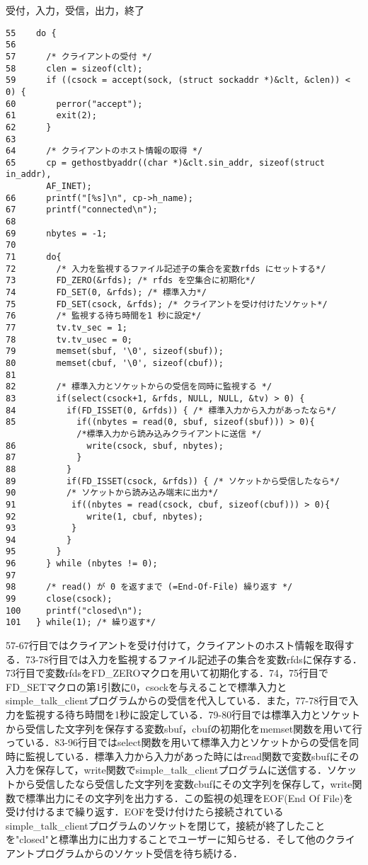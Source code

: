 \documentclass[a4j]{jarticle}
\newenvironment{bit}{\begin{breakitembox}}{\end{breakitembox}} %
\newcommand{\stc}{simple\_talk\_clientプログラム}
\begin{document}
\begin{bit}[l]{受付，入力，受信，出力，終了}
\begin{verbatim}
55	  do {
56
57	    /* クライアントの受付 */
58	    clen = sizeof(clt);
59	    if ((csock = accept(sock, (struct sockaddr *)&clt, &clen)) < 0) {
60	      perror("accept");
61	      exit(2);
62	    }
63
64	    /* クライアントのホスト情報の取得 */
65	    cp = gethostbyaddr((char *)&clt.sin_addr, sizeof(struct in_addr),
        AF_INET);
66	    printf("[%s]\n", cp->h_name);
67	    printf("connected\n");
68
69	    nbytes = -1;
70
71	    do{
72	      /* 入力を監視するファイル記述子の集合を変数rfds にセットする*/
73	      FD_ZERO(&rfds); /* rfds を空集合に初期化*/
74	      FD_SET(0, &rfds); /* 標準入力*/
75	      FD_SET(csock, &rfds); /* クライアントを受け付けたソケット*/
76	      /* 監視する待ち時間を1 秒に設定*/
77	      tv.tv_sec = 1;
78	      tv.tv_usec = 0;
79	      memset(sbuf, '\0', sizeof(sbuf));
80	      memset(cbuf, '\0', sizeof(cbuf));
81
82	      /* 標準入力とソケットからの受信を同時に監視する */
83	      if(select(csock+1, &rfds, NULL, NULL, &tv) > 0) {
84	        if(FD_ISSET(0, &rfds)) { /* 標準入力から入力があったなら*/
85	          if((nbytes = read(0, sbuf, sizeof(sbuf))) > 0){
              /*標準入力から読み込みクライアントに送信 */
86	            write(csock, sbuf, nbytes);
87	          }
88	        }
89	        if(FD_ISSET(csock, &rfds)) { /* ソケットから受信したなら*/
90	        /* ソケットから読み込み端末に出力*/
91	         if((nbytes = read(csock, cbuf, sizeof(cbuf))) > 0){
92	            write(1, cbuf, nbytes);
93	         }
94	        }
95	      }
96	    } while (nbytes != 0);
97
98	    /* read() が 0 を返すまで (=End-Of-File) 繰り返す */
99	    close(csock);
100	    printf("closed\n");
101	  } while(1); /* 繰り返す*/
\end{verbatim}
\end{bit}

57-67行目ではクライアントを受け付けて，クライアントのホスト情報を取得する．73-78行目では入力を監視するファイル記述子の集合を変数rfdsに保存する．73行目で変数rfdsをFD\_ZEROマクロを用いて初期化する．74，75行目でFD\_SETマクロの第1引数に0，csockを与えることで標準入力と\stc からの受信を代入している．また，77-78行目で入力を監視する待ち時間を1秒に設定している．79-80行目では標準入力とソケットから受信した文字列を保存する変数sbuf，cbufの初期化をmemset関数を用いて行っている．83-96行目ではselect関数を用いて標準入力とソケットからの受信を同時に監視している．標準入力から入力があった時にはread関数で変数sbufにその入力を保存して，write関数で\stc に送信する．ソケットから受信したなら受信した文字列を変数cbufにその文字列を保存して，write関数で標準出力にその文字列を出力する．この監視の処理をEOF(End Of File)を受け付けるまで繰り返す．EOFを受け付けたら接続されている\stc のソケットを閉じて，接続が終了したことを"closed"と標準出力に出力することでユーザーに知らせる．そして他のクライアントプログラムからのソケット受信を待ち続ける．
\end{document}
